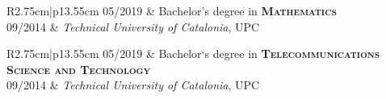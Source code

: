 \documentclass[a4paper,10pt]{article} %
\newcommand\rightColumnWidth{13.55cm}
\newcommand\leftColumnWidth{2.75cm}
\begin{document}
\begin{tabular}{R{\leftColumnWidth}|p{\rightColumnWidth}}	
    \textsc{05/2019} & Bachelor's degree in \textbf{\textsc{Mathematics}} \\ 
    \textsc{09/2014} & \small{\emph{Technical University of Catalonia}, UPC}\\
\end{tabular}

\begin{tabular}{R{\leftColumnWidth}|p{\rightColumnWidth}}	
    \textsc{05/2019} &  Bachelor`s degree in \textbf{\textsc{Telecommunications Science and Technology}}\\ 
    \textsc{09/2014} & \small{\emph{Technical University of Catalonia}, UPC} \\
\end{tabular}
\end{document}
